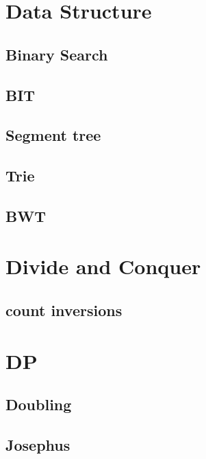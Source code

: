 \section{Data Structure}
        \subsection{Binary Search}
                
        \subsection{BIT}
                
        \subsection{Segment tree}
                
        \subsection{Trie}
                
        \subsection{BWT}
                

\section{Divide and Conquer}
        \subsection{count inversions}
                

\section{DP} 
        \subsection{Doubling}
                
        \subsection{Josephus}
                
